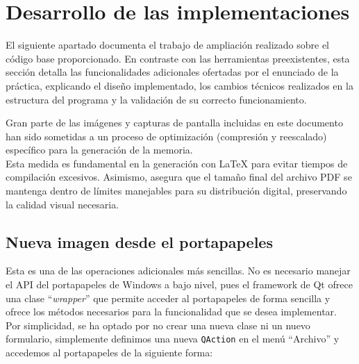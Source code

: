 \documentclass[11pt]{article}
\begin{document}
          \clearpage

\section{Desarrollo de las implementaciones}

  El siguiente apartado documenta el trabajo de ampliación realizado sobre el
  código base proporcionado. En contraste con las herramientas preexistentes,
  esta sección detalla las funcionalidades adicionales ofertadas por el enunciado
  de la práctica, explicando el diseño implementado, los cambios técnicos
  realizados en la estructura del programa y la validación de su correcto
  funcionamiento.

  \begin{warn}
      Gran parte de las imágenes y capturas de pantalla incluidas en este documento han sido sometidas a un proceso de optimización (compresión y reescalado) específico para la generación de la memoria. \\

      \noindent
      Esta medida es fundamental en la generación con \LaTeX{} para evitar tiempos de compilación excesivos. Asimismo, asegura que el tamaño final del archivo PDF se mantenga dentro de límites manejables para su distribución digital, preservando la calidad visual necesaria.
  \end{warn}

  \clearpage

  \subsection{Nueva imagen desde el portapapeles}

      \noindent
      Esta es una de las operaciones adicionales más sencillas. No es necesario manejar el API del portapapeles de Windows a bajo nivel, pues el
      framework de Qt ofrece una clase ``\textit{wrapper}'' que permite acceder al portapapeles de forma sencilla y ofrece los métodos necesarios
      para la funcionalidad que se desea implementar. \cite{qt_qclipboard} \\

      Por simplicidad, se ha optado por no crear una nueva clase ni un nuevo
      formulario, simplemente definimos una nueva \texttt{QAction} en el menú
      ``Archivo'' y accedemos al portapapeles de la siguiente forma:
\end{document}
